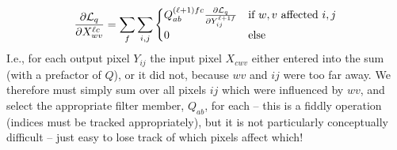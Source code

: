 \documentclass[10pt, twocolumn]{article}
\renewcommand\vec[1]{\boldsymbol{\textbf{#1}}}
\begin{document}
			\begin{equation}
				\frac{\partial \mathcal{L}_q}{\partial X^{\ell c}_{wv}} = \sum_f \sum_{i,j} \begin{cases} Q^{(\ell+1) f c}_{ab} \frac{\partial \mathcal{L}_q}{\partial Y^{{\ell+1} f}_{ij}} & \text{if $w,v$ affected $i,j$}
				\\
				0 & \text{else}
				\end{cases}
			\end{equation}
			I.e., for each output pixel $Y_{ij}$ the input pixel $X_{cwv}$ either entered into the sum (with a prefactor of $Q$), or it did not, because $wv$ and $ij$ were too far away. We therefore must simply sum over all pixels $ij$ which were influenced by $wv$, and select the appropriate filter member, $Q_{ab}$, for each -- this is a fiddly operation (indices must be tracked appropriately), but it is not particularly conceptually difficult -- just easy to lose track of which pixels affect which!




\end{document}
